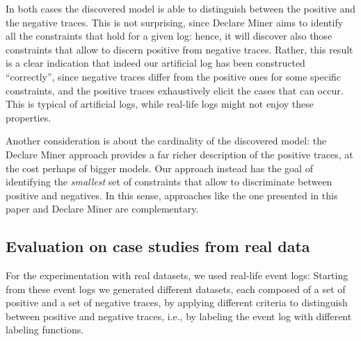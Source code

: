 In both cases the discovered model is able to distinguish between the positive and the negative traces. This is not surprising, since Declare Miner aims to identify all the constraints that hold for a given log: hence, it will discover also those constraints that allow to discern positive from negative traces. Rather, this result is a clear indication that indeed our artificial log has been constructed ``correctly'', since negative traces differ from the positive ones for some specific constraints, and the positive traces exhaustively elicit the cases that can occur. 
This is typical of artificial logs, while real-life logs might not enjoy these properties.

Another consideration is about the cardinality of the discovered model: the Declare Miner approach provides a far richer description of the positive traces, at the cost perhaps of bigger models. Our approach instead has the goal of identifying the \emph{smallest} set of constraints that allow to discriminate between positive and negatives. In this sense, approaches like the one presented in this paper and Declare Miner are complementary.




\subsection{Evaluation on case studies from real data}
\label{sec:realdata}


For the experimentation with real datasets, we used  real-life event logs:  Starting from these event logs we generated  different datasets, each composed of a set of positive and a set of negative traces, by applying different criteria to distinguish between positive and negative traces, i.e., by labeling the event log with different labeling functions. 
 
